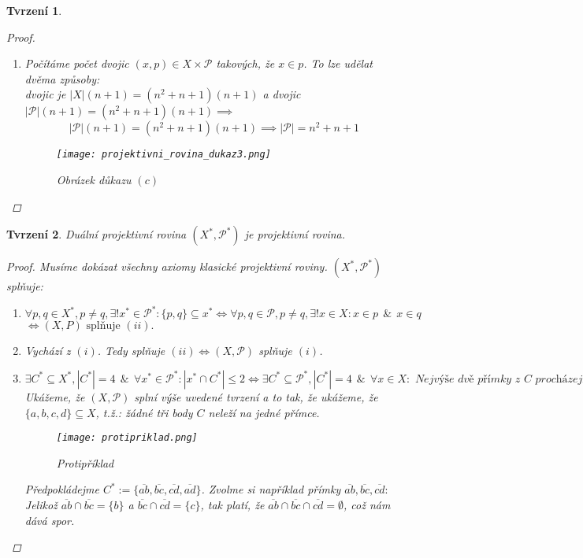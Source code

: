 \documentclass[10pt,a4paper]{article}
\newtheorem{tvrzeni}{Tvrzení}
\newcommand{\Pp}{{\mathcal{P}}}     %
\newcommand\makesmall{\fontsize{8pt}{11pt}\selectfont}
\begin{document}
\begin{tvrzeni}
\begin{proof}
\begin{enumerate}[label=(\alph*)]
            \item Počítáme počet dvojic $(x,p)\in X\times \Pp$ takových, že $x\in p$. To lze udělat dvěma způsoby:\\
            dvojic je $|X|(n+1)=(n^2+n+1)(n+1)$ a dvojic $|\Pp|(n+1)=(n^2+n+1)(n+1) \implies$
            $$|\Pp|(n+1)=(n^2+n+1)(n+1) \implies |\Pp|=n^2+n+1$$
            \begin{figure}[h]
                \caption{\makesmall\textit{Obrázek důkazu $(c)$}}
                \centering
                \texttt{[image: projektivni\_rovina\_dukaz3.png]}
            \end{figure}
        \end{enumerate}
    \end{proof}
\end{tvrzeni}
\newpage
\begin{tvrzeni}
    Duální projektivní rovina $(X^*, \Pp^*)$ je projektivní rovina.

    \begin{proof}
        Musíme dokázat všechny axiomy klasické projektivní roviny. $(X^*, \Pp^*)$ splňuje:
        \begin{enumerate}[label=(\roman*)]
            \item $\forall p,q \in X^*, p\neq q, \exists! x^* \in \Pp^*:\{p,q\}\subseteq x^* \iff \forall p,q \in \Pp, p\neq q, \exists ! x \in X: x \in p ~~\&~~x\in q$ \\ 
                $\iff (X,P) \text{ splňuje }(ii).$
            \item Vychází z $(i)$. Tedy splňuje $(ii) \iff (X, \Pp)$ splňuje $(i)$.
            \item $\exists C^* \subseteq X^*, |C^*|=4 ~~\&~~ \forall x^*\in \Pp^*: |x^*\cap C^*|\leq 2 \iff \exists C^* \subseteq \Pp^*, |C^*|=4 ~~\&~~ \forall x\in X: \textit{ Nejvýše dvě přímky z $C$ procházejí skrz $x$}:$\\
                Ukážeme, že $(X, \Pp)$ splní výše uvedené tvrzení a to tak, že ukážeme, že $\{a,b,c,d\} \subseteq X$, t.ž.: žádné tři body $C$ neleží na jedné přímce.
                \begin{figure}[h]
                    \caption{\makesmall\textit{Protipříklad}}
                    \centering
                    \texttt{[image: protipriklad.png]}
                \end{figure}

                Předpokládejme $C^*:= \{\overline{ab}, \overline{bc}, \overline{cd}, \overline{ad}\}$. Zvolme si například přímky $\overline{ab}, \overline{bc}, \overline{cd}:$\\
                Jelikož $\overline{ab} \cap \overline{bc} = \{b\}$  a $\overline{bc} \cap \overline{cd} = \{c\}$, tak platí, že $\overline{ab} \cap \overline{bc} \cap \overline{cd} = \emptyset$, což nám dává spor.
        \end{enumerate}
    \end{proof}
\end{tvrzeni}
\end{document}
